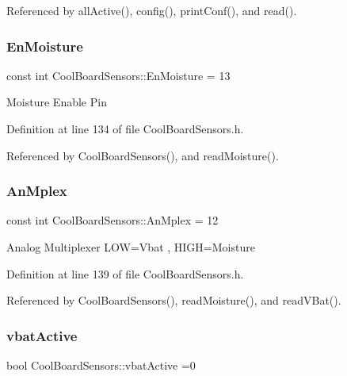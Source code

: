 Referenced by all\+Active(), config(), print\+Conf(), and read().

\mbox{\label{class_cool_board_sensors_a6177d02e14a057a2f171a2e930b5038d}} 
\subsubsection{\texorpdfstring{En\+Moisture}{EnMoisture}}
{\footnotesize\ttfamily const int Cool\+Board\+Sensors\+::\+En\+Moisture = 13\hspace{0.3cm}{\ttfamily [private]}}

Moisture Enable Pin 

Definition at line 134 of file Cool\+Board\+Sensors.\+h.



Referenced by Cool\+Board\+Sensors(), and read\+Moisture().

\mbox{\label{class_cool_board_sensors_a12ef28b1046219e0aee10bf64e28c4a5}} 
\subsubsection{\texorpdfstring{An\+Mplex}{AnMplex}}
{\footnotesize\ttfamily const int Cool\+Board\+Sensors\+::\+An\+Mplex = 12\hspace{0.3cm}{\ttfamily [private]}}

Analog Multiplexer L\+OW=Vbat , H\+I\+GH=Moisture 

Definition at line 139 of file Cool\+Board\+Sensors.\+h.



Referenced by Cool\+Board\+Sensors(), read\+Moisture(), and read\+V\+Bat().

\mbox{\label{class_cool_board_sensors_ab0b4bbae83796b52b90f91008d383583}} 
\subsubsection{\texorpdfstring{vbat\+Active}{vbatActive}}
{\footnotesize\ttfamily bool Cool\+Board\+Sensors\+::vbat\+Active =0\hspace{0.3cm}{\ttfamily [private]}}

